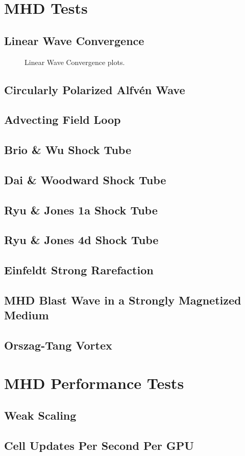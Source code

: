 \section{MHD Tests}
\label{sec:mhd-tests}

\subsection{Linear Wave Convergence}

\begin{figure}[ht!]
    \caption{Linear Wave Convergence plots. 
    }
    \label{fig:linear-wave-convergence}
\end{figure}

\subsection{Circularly Polarized Alfv\'en Wave}
\subsection{Advecting Field Loop}
\subsection{Brio \& Wu Shock Tube}
\subsection{Dai \& Woodward Shock Tube}
\subsection{Ryu \& Jones 1a Shock Tube}
\subsection{Ryu \& Jones 4d Shock Tube}
\subsection{Einfeldt Strong Rarefaction}
\subsection{MHD Blast Wave in a Strongly Magnetized Medium}
\subsection{Orszag-Tang Vortex}


\section{MHD Performance Tests}
\label{sec:mhd-perf-tests}


\subsection{Weak Scaling}

\subsection{Cell Updates Per Second Per GPU}

